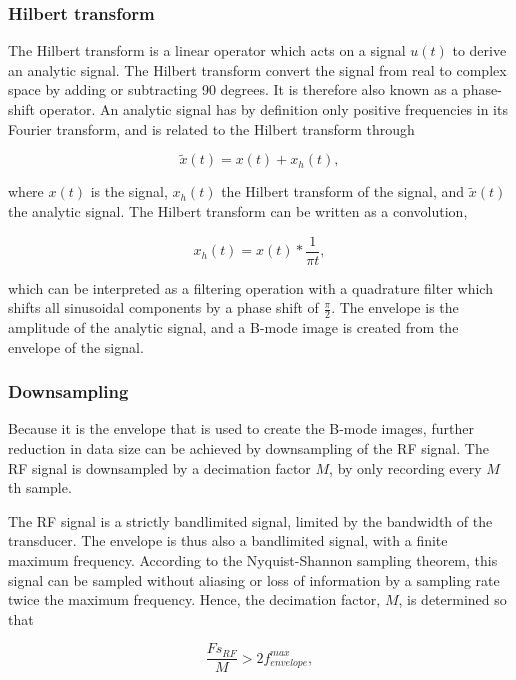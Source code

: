 \subsubsection{Hilbert transform}
The Hilbert transform is a linear operator which acts on a signal $u(t)$ to derive an analytic signal. The Hilbert transform convert the signal from real to complex space by adding or subtracting 90 degrees. It is therefore also known as a phase-shift operator. An analytic signal has by definition only positive frequencies in its Fourier transform, and is related to the Hilbert transform through 

\begin{equation}
\tilde{x}(t) = x(t) + x_h(t),
\end{equation}

where $x(t)$ is the signal, $x_h(t)$ the Hilbert transform of the signal, and $\tilde{x}(t)$ the analytic signal. The Hilbert transform can be written as a convolution, 

\begin{equation}
x_h(t) = x(t)*\frac{1}{\pi t},
\end{equation}

which can be interpreted as a filtering operation with a quadrature filter which shifts all sinusoidal components by a phase shift of $\frac{\pi}{2}$. The envelope is the amplitude of the analytic signal, and a B-mode image is created from the envelope of the signal. 

\subsubsection{Downsampling}
Because it is the envelope that is used to create the B-mode images, further reduction in data size can be achieved by downsampling of the RF signal. The RF signal is downsampled by a decimation factor $M$, by only recording every $M$th sample. 

The RF signal is a strictly bandlimited signal, limited by the bandwidth of the transducer. The envelope is thus also a bandlimited signal, with a finite maximum frequency. According to the Nyquist-Shannon sampling theorem, this signal can be sampled without aliasing or loss of information by a sampling rate twice the maximum frequency. Hence, the decimation factor, $M$, is determined so that

\begin{equation}
\label{deciamtion}
\frac{Fs_{RF}}{M} > 2f^{max}_{envelope},
\end{equation}

